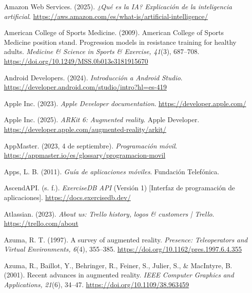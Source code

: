\begin{referenciasapa}
\item Amazon Web Services. (2025). \textit{¿Qué es la IA? Explicación de la inteligencia artificial}. \url{https://aws.amazon.com/es/what-is/artificial-intelligence/}

\item American College of Sports Medicine. (2009).
    American College of Sports Medicine position stand. Progression models in resistance training for healthy adults.
    \textit{Medicine \& Science in Sports \& Exercise, 41}(3), 687--708.
    \url{https://doi.org/10.1249/MSS.0b013e3181915670}

\item Android Developers. (2024). \textit{Introducción a Android Studio}. \url{https://developer.android.com/studio/intro?hl=es-419}

\item Apple Inc. (2023). \textit{Apple Developer documentation}. \url{https://developer.apple.com/}

\item Apple Inc. (2025). \textit{ARKit 6: Augmented reality}. Apple Developer. \url{https://developer.apple.com/augmented-reality/arkit/}

\item AppMaster. (2023, 4 de septiembre). \textit{Programación móvil}. \url{https://appmaster.io/es/glossary/programacion-movil}

\item Apps, L. B. (2011). \textit{Guía de aplicaciones móviles}. Fundación Telefónica.

\item AscendAPI. (s. f.). \textit{ExerciseDB API} (Versión 1) [Interfaz de programación de aplicaciones]. \url{https://docs.exercisedb.dev/}

\item Atlassian. (2023). \textit{About us: Trello history, logos \& customers | Trello}. \url{https://trello.com/about}

\item Azuma, R. T. (1997). A survey of augmented reality. \textit{Presence: Teleoperators and Virtual Environments, 6}(4), 355--385. \url{https://doi.org/10.1162/pres.1997.6.4.355}

\item Azuma, R., Baillot, Y., Behringer, R., Feiner, S., Julier, S., \& MacIntyre, B. (2001). Recent advances in augmented reality. \textit{IEEE Computer Graphics and Applications, 21}(6), 34--47. \url{https://doi.org/10.1109/38.963459}


\end{referenciasapa}
